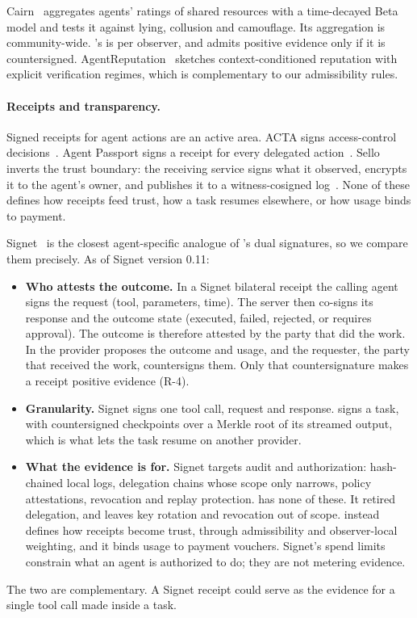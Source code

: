 Cairn~\cite{chard2026cairn} aggregates agents' ratings of shared
resources with a time-decayed Beta model and tests it against lying,
collusion and camouflage. Its aggregation is community-wide. \sys{}'s is
per observer, and \sys{} admits positive evidence only if it is
countersigned. AgentReputation~\cite{chishti2026agentreputation} sketches
context-conditioned reputation with explicit verification regimes, which
is complementary to our admissibility rules.

\paragraph{Receipts and transparency.}
Signed receipts for agent actions are an active area. ACTA signs
access-control decisions~\cite{acta2026}. Agent Passport signs a receipt
for every delegated action~\cite{aps}. Sello inverts the trust boundary:
the receiving service signs what it observed, encrypts it to the agent's
owner, and publishes it to a witness-cosigned log~\cite{figuera2026sello}.
None of these defines how receipts feed trust, how a task resumes
elsewhere, or how usage binds to payment.

Signet~\cite{signet} is the closest agent-specific analogue of \sys{}'s
dual signatures, so we compare them precisely. As of Signet version 0.11:
\begin{itemize}
\item \textbf{Who attests the outcome.} In a Signet bilateral receipt the
  calling agent signs the request (tool, parameters, time). The server
  then co-signs its response and the outcome state (executed, failed,
  rejected, or requires approval). The outcome is therefore attested by
  the party that did the work. In \sys{} the provider proposes the
  outcome and usage, and the requester, the party that received the
  work, countersigns them. Only that countersignature makes a receipt
  positive evidence (R-4).
\item \textbf{Granularity.} Signet signs one tool call, request and
  response. \sys{} signs a task, with countersigned checkpoints over a
  Merkle root of its streamed output, which is what lets the task resume
  on another provider.
\item \textbf{What the evidence is for.} Signet targets audit and
  authorization: hash-chained local logs, delegation chains whose scope
  only narrows, policy attestations, revocation and replay protection.
  \sys{} has none of these. It retired delegation, and leaves key
  rotation and revocation out of scope. \sys{} instead defines how
  receipts become trust, through admissibility and observer-local
  weighting, and it binds usage to payment vouchers. Signet's spend
  limits constrain what an agent is authorized to do; they are not
  metering evidence.
\end{itemize}
The two are complementary. A Signet receipt could serve as the evidence
for a single tool call made inside a \sys{} task.

